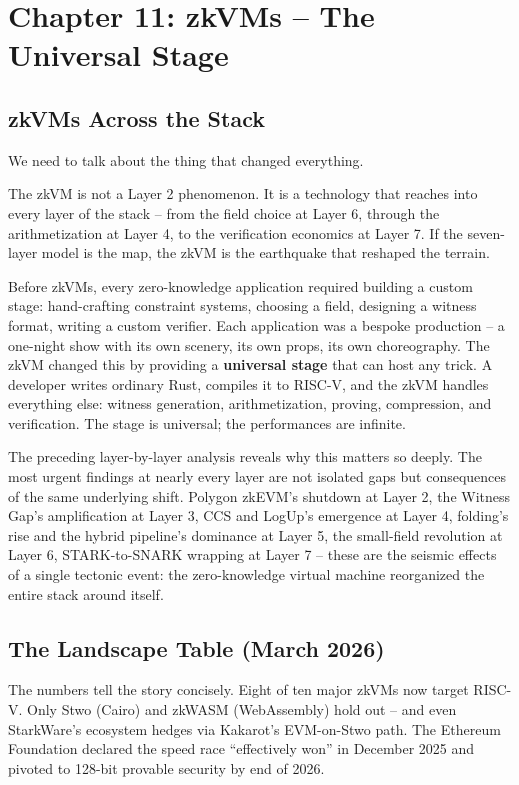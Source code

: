 \documentclass[
  11pt,
  openany]{report}
\renewcommand{\textbf}[1]{{\bfseries\color{MidnightBold}#1}}
\begin{document}
\chapter{Chapter 11: zkVMs -- The Universal
Stage}\label{chapter-11-zkvms-the-universal-stage}

\section{zkVMs Across the Stack}\label{zkvms-across-the-stack}

We need to talk about the thing that changed everything.

The zkVM is not a Layer 2 phenomenon. It is a technology that reaches into every
layer of the stack -- from the field choice at Layer 6, through the
arithmetization at Layer 4, to the verification economics at Layer 7. If the
seven-layer model is the map, the zkVM is the earthquake that reshaped the
terrain.

Before zkVMs, every zero-knowledge application required building a custom stage:
hand-crafting constraint systems, choosing a field, designing a witness format,
writing a custom verifier. Each application was a bespoke production -- a
one-night show with its own scenery, its own props, its own choreography. The
zkVM changed this by providing a \textbf{universal stage} that can host any
trick. A developer writes ordinary Rust, compiles it to RISC-V, and the zkVM
handles everything else: witness generation, arithmetization, proving,
compression, and verification. The stage is universal; the performances are
infinite.

The preceding layer-by-layer analysis reveals why this matters so deeply. The
most urgent findings at nearly every layer are not isolated gaps but
consequences of the same underlying shift. Polygon zkEVM's shutdown at Layer 2,
the Witness Gap's amplification at Layer 3, CCS and LogUp's emergence at Layer
4, folding's rise and the hybrid pipeline's dominance at Layer 5, the
small-field revolution at Layer 6, STARK-to-SNARK wrapping at Layer 7 -- these
are the seismic effects of a single tectonic event: the zero-knowledge virtual
machine reorganized the entire stack around itself.

\section{The Landscape Table (March 2026)}\label{the-landscape-table-march-2026}

The numbers tell the story concisely. Eight of ten major zkVMs now target
RISC-V. Only Stwo (Cairo) and zkWASM (WebAssembly) hold out -- and even
StarkWare's ecosystem hedges via Kakarot's EVM-on-Stwo path. The Ethereum
Foundation declared the speed race ``effectively won'' in December 2025 and
pivoted to 128-bit provable security by end of 2026.
\end{document}
